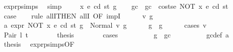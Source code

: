 \begin{isabellebody}
\ expr{\isachardot}{\kern0pt}psimps{\isacharparenleft}{\kern0pt}{}{\isacharparenright}{\kern0pt}\ \isamarkupfalse%
\ simp\isanewline
{}\isamarkupfalse%
\isanewline
\ \ \isamarkupfalse%
\ {\isacharparenleft}{\kern0pt}{}{}\ x\ e\ cd\ st\ g{\isacharparenright}{\kern0pt}\isanewline
\ \ \isamarkupfalse%
\ gc\ \ {\isachardoublequoteopen}gc\ {\isacharequal}{\kern0pt}\ costs\isactrlsub e\ {\isacharparenleft}{\kern0pt}NOT\ x{\isacharparenright}{\kern0pt}\ e\ cd\ st{\isachardoublequoteclose}\isanewline
\ \ \isamarkupfalse%
\ {\isacharquery}{\kern0pt}case\isanewline
\ \ \isamarkupfalse%
\ {\isacharparenleft}{\kern0pt}rule\ allI{\isacharbrackleft}{\kern0pt}THEN\ allI{\isacharcomma}{\kern0pt}\ OF\ impI{\isacharbrackright}{\kern0pt}{\isacharparenright}{\kern0pt}\isanewline
\ \ \ \ \isamarkupfalse%
\ v{}\ g{}{\isacharprime}{\kern0pt}\ \isamarkupfalse%
\ a{}{\isacharcolon}{\kern0pt}\ {\isachardoublequoteopen}expr\ {\isacharparenleft}{\kern0pt}NOT\ x{\isacharparenright}{\kern0pt}\ e\ cd\ st\ g\ {\isacharequal}{\kern0pt}\ Normal\ {\isacharparenleft}{\kern0pt}v{}{\isacharcomma}{\kern0pt}\ g{}{\isacharprime}{\kern0pt}{\isacharparenright}{\kern0pt}{\isachardoublequoteclose}\isanewline
\ \ \ \ \isamarkupfalse%
\ {\isachardoublequoteopen}g{}{\isacharprime}{\kern0pt}\ {\isasymle}\ g{\isachardoublequoteclose}\isanewline
\ \ \ \ \isamarkupfalse%
\ {\isacharparenleft}{\kern0pt}cases\ v{}{\isacharparenright}{\kern0pt}\isanewline
\ \ \ \ \ \ \isamarkupfalse%
\ {\isacharparenleft}{\kern0pt}Pair\ l{}\ t{}{\isacharparenright}{\kern0pt}\isanewline
\ \ \ \ \ \ \isamarkupfalse%
\ {\isacharquery}{\kern0pt}thesis\isanewline
\ \ \ \ \ \ \isamarkupfalse%
\ {\isacharparenleft}{\kern0pt}cases{\isacharparenright}{\kern0pt}\isanewline
\ \ \ \ \ \ \ \ \isamarkupfalse%
\ {\isachardoublequoteopen}g\ {\isasymle}\ gc{\isachardoublequoteclose}\isanewline
\ \ \ \ \ \ \ \ \isamarkupfalse%
\ gc{\isacharunderscore}{\kern0pt}def\ a{}\ \isamarkupfalse%
\ {\isacharquery}{\kern0pt}thesis\ \isamarkupfalse%
\ expr{\isachardot}{\kern0pt}psimps{\isacharparenleft}{\kern0pt}{}{}{\isacharparenright}{\kern0pt}{\isacharbrackleft}{\kern0pt}OF\ {}{}{\isacharparenleft}{\kern0pt}{}{\isacharparenright}{\kern0pt}{\isacharbrackright}{\kern0pt}\ \isamarkupfalse%

\end{isabellebody}

